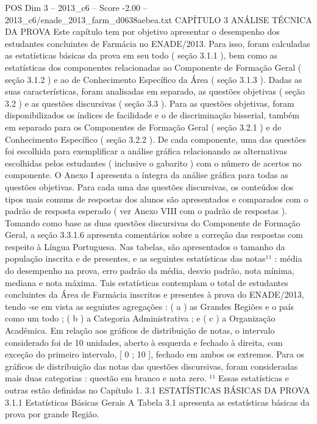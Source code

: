 \begin{textsample}{POS Dim 3 – 2013\_c6 – Score -2.00 – 2013\_c6/enade\_2013\_farm\_d0638aebea.txt}  \label{ex:f3_pos_235}
CAPÍTULO 3 ANÁLISE TÉCNICA DA PROVA Este capítulo tem por objetivo apresentar o desempenho dos estudantes concluintes de Farmácia no ENADE/2013.
Para isso, foram calculadas as estatísticas básicas da prova em seu todo ( seção 3.1.1 ), bem como as estatísticas dos componentes relacionadas ao Componente de Formação Geral ( seção 3.1.2 ) e ao de Conhecimento Específico da Área ( seção 3.1.3 ).
Dadas as suas características, foram analisadas em separado, as questões objetivas ( seção 3.2 ) e as questões discursivas ( seção 3.3 ).
Para as questões objetivas, foram disponibilizados os índices de facilidade e o de discriminação bisserial, também em separado para os Componentes de Formação Geral ( seção 3.2.1 ) e de Conhecimento Específico ( seção 3.2.2 ).
De cada componente, uma das questões foi escolhida para exemplificar a análise gráfica relacionando as alternativas escolhidas pelos estudantes ( inclusive o gabarito ) com o número de acertos no componente.
O Anexo I apresenta a íntegra da análise gráfica para todas as questões objetivas.
Para cada uma das questões discursivas, os conteúdos dos tipos mais comuns de respostas dos alunos são apresentados e comparados com o padrão de resposta esperado ( ver Anexo VIII com o padrão de respostas ).
Tomando como base as duas questões discursivas do Componente de Formação Geral, a seção 3.3.1.6 apresenta comentários sobre a correção das respostas com respeito à Língua Portuguesa.
Nas tabelas, são apresentados o tamanho da população inscrita e de presentes, e as seguintes estatísticas das notas¹¹ : média do desempenho na prova, erro padrão da média, desvio padrão, nota mínima, mediana e nota máxima.
Tais estatísticas contemplam o total de estudantes concluintes da Área de Farmácia inscritos e presentes à prova do ENADE/2013, tendo -se em vista as seguintes agregações : ( a ) as Grandes Regiões e o país como um todo ; ( b ) a Categoria Administrativa ; e ( c ) a Organização Acadêmica.
Em relação aos gráficos de distribuição de notas, o intervalo considerado foi de 10 unidades, aberto à esquerda e fechado à direita, com exceção do primeiro intervalo, [ 0 ; 10 ], fechado em ambos os extremos.
Para os gráficos de distribuição das notas das questões discursivas, foram consideradas mais duas categorias : questão em branco e nota zero. ¹¹ Essas estatísticas e outras estão definidas no Capítulo 1. 3.1 ESTATÍSTICAS BÁSICAS DA PROVA 3.1.1 Estatísticas Básicas Gerais A Tabela 3.1 apresenta as estatísticas básicas da prova por grande Região.

\end{textsample}
